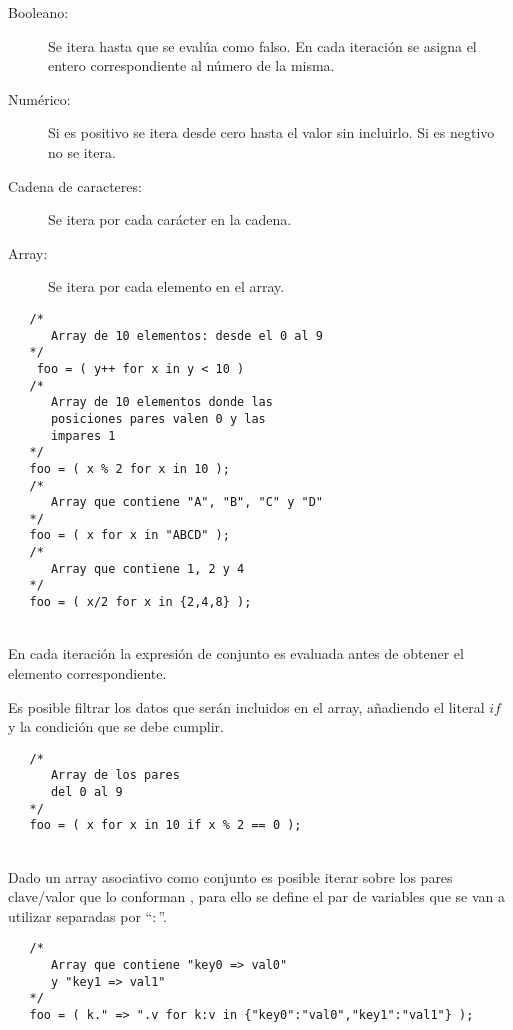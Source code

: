 \begin {description}
\item [Booleano:] Se itera hasta que se evalúa como falso. En cada iteración se asigna el entero correspondiente al número de la misma.
\item [Numérico:] Si es positivo se itera desde cero hasta el valor sin incluirlo. Si es negtivo no se itera.
\item [Cadena de caracteres:] Se itera por cada carácter en la cadena.
\item [Array:] Se itera por cada elemento en el array.
\end{description}

\begin{lstlisting}
   /*
      Array de 10 elementos: desde el 0 al 9
   */
    foo = ( y++ for x in y < 10 )
   /*
      Array de 10 elementos donde las 
      posiciones pares valen 0 y las
      impares 1
   */
   foo = ( x % 2 for x in 10 ); 
   /*
      Array que contiene "A", "B", "C" y "D"
   */
   foo = ( x for x in "ABCD" ); 
   /*
      Array que contiene 1, 2 y 4
   */
   foo = ( x/2 for x in {2,4,8} ); 
\end{lstlisting}
\hfill\\ 


En cada iteración la expresión de conjunto es evaluada antes de obtener el elemento correspondiente.

Es posible filtrar los datos que serán incluidos en el array, añadiendo el literal
$if$ y la condición que se debe cumplir. \\

\begin{lstlisting}
   /*
      Array de los pares
      del 0 al 9
   */
   foo = ( x for x in 10 if x % 2 == 0 );
\end{lstlisting}
\hfill\\ 


Dado un array asociativo como conjunto es posible iterar sobre los pares clave/valor que lo conforman ,
para ello se define el par de variables que se van a utilizar separadas por ``$:$''. \\

\begin{lstlisting}
   /*
      Array que contiene "key0 => val0"
      y "key1 => val1"
   */
   foo = ( k." => ".v for k:v in {"key0":"val0","key1":"val1"} );
\end{lstlisting}
\hfill\\ 

